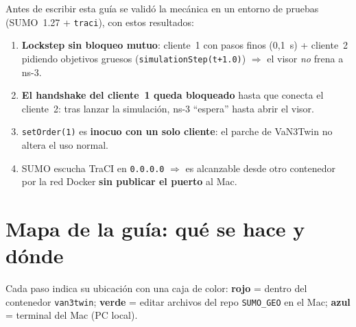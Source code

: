 \documentclass[11pt,a4paper]{article}
\begin{document}
\begin{validadobox}
Antes de escribir esta guía se validó la mecánica en un entorno de pruebas
(SUMO~1.27 + \texttt{traci}), con estos resultados:
\begin{enumerate}[leftmargin=1.6em, itemsep=1pt]
  \item \textbf{Lockstep sin bloqueo mutuo}: cliente~1 con pasos finos (0{,}1~s) +
        cliente~2 pidiendo objetivos gruesos (\texttt{simulationStep(t+1.0)})
        $\Rightarrow$ el visor \emph{no} frena a ns-3.
  \item \textbf{El handshake del cliente~1 queda bloqueado} hasta que conecta el
        cliente~2: tras lanzar la simulación, ns-3 ``espera'' hasta abrir el visor.
  \item \texttt{setOrder(1)} es \textbf{inocuo con un solo cliente}: el parche de
        VaN3Twin no altera el uso normal.
  \item SUMO escucha TraCI en \texttt{0.0.0.0} $\Rightarrow$ es alcanzable desde otro
        contenedor por la red Docker \textbf{sin publicar el puerto} al Mac.
\end{enumerate}
\end{validadobox}

\section{Mapa de la guía: qué se hace y dónde}

Cada paso indica su ubicación con una caja de color:
\textcolor{rojo}{\textbf{rojo}} = dentro del contenedor \texttt{van3twin};
\textcolor{verde}{\textbf{verde}} = editar archivos del repo \texttt{SUMO\_GEO} en el Mac;
\textcolor{azul}{\textbf{azul}} = terminal del Mac (PC local).
\end{document}
